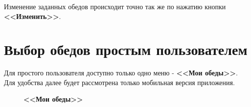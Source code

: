 \documentclass[a4paper]{article}
\begin{document}
Изменение заданных обедов происходит точно так же по нажатию кнопки \textbf{<<Изменить>>}.

\section{Выбор обедов простым пользователем}

Для простого пользователя доступно только одно меню - \textbf{<<Мои обеды>>}. Для удобства далее будет рассмотрена только мобильная версия приложения.

\begin{figure}[h]
\begin{minipage}[h]{0.49\linewidth}
\end{minipage}
\hfill
\begin{minipage}[h]{0.49\linewidth}
\end{minipage}
\caption{\textbf{<<Мои обеды>>}}
\label{fig:image26}
\end{figure}
\end{document}
